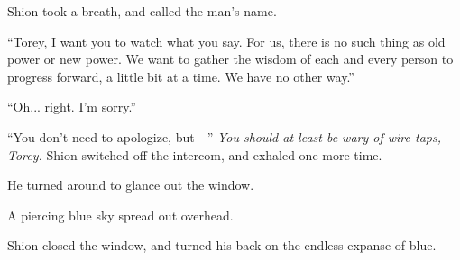 Shion took a breath, and called the man's name.

``Torey, I want you to watch what you say. For us, there is no such
thing as old power or new power. We want to gather the wisdom of each
and every person to progress forward, a little bit at a time. We have no
other way.''

``Oh... right. I'm sorry.''

``You don't need to apologize, but―'' \emph{You should at least be wary of
wire-taps, Torey.} Shion switched off the intercom, and exhaled one more
time.

He turned around to glance out the window.

A piercing blue sky spread out overhead.

Shion closed the window, and turned his back on the endless expanse of
blue.